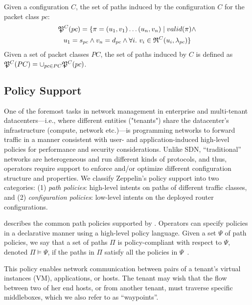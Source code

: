 \begin{definition} \label{def:inducedpaths}
Given a configuration $C$, the set of paths induced
by the configuration $C$ for the packet class $pc$:
\begin{multline*}
\mathfrak{P}^C(pc) = \{\pi=(u_1, v_1)\ldots (u_n, v_n) \mid 
valid(\pi) \wedge \\
u_1 = s_{pc} \wedge v_n= d_{pc} \wedge
\forall i. ~v_i \in \mathfrak{R}^C(u_i,\lambda_{pc})\}
\end{multline*}
Given a set of packet classes $PC$, the set of paths
 induced by $C$ is defined as
$\mathfrak{P}^C(PC) = \cup_{pc\in PC} \mathfrak{P}^C(pc)$.
\end{definition}

\subsection{Policy Support} \label{sec:policy}

One of the foremost tasks in network management in enterprise 
and multi-tenant datacenters---i.e., where different entities ("tenants") share the datacenter's 
infrastructure (compute, network etc.)---is programming 
networks to forward traffic in a manner consistent with user- and
application-induced high-level policies for performance and security considerations. 
Unlike SDN, ``traditional'' networks are  heterogeneous and run different kinds of 
protocols, and thus, operators require
 support to enforce and/or optimize different
configuration  structure and properties. We 
classify Zeppelin's policy support  into two categories: 
(1) \emph{path policies}: high-level intents on paths of different traffic classes, and 
(2) \emph{configuration policies}: low-level intents on the deployed router configurations. 

  
 describes 
the common path policies 
supported by \name. 
Operators can
specify policies in a declarative manner using a high-level 
policy language. 
Given  a set $\Psi$ of
path policies, we say that
a set of paths $\Pi$ is policy-compliant with respect to $\Psi$, 
denoted  $\Pi \models \Psi$,
if the paths in $\Pi$ satisfy all the policies in $\Psi$~\cite{genesis}.


This policy enables network communication
between pairs of a tenant's virtual instances (VM), 
applications, or hosts.  
The tenant may wish that the flow
between two of her end hosts, or from another tenant, must traverse
specific middleboxes, which we also refer to as ``waypoints''.

